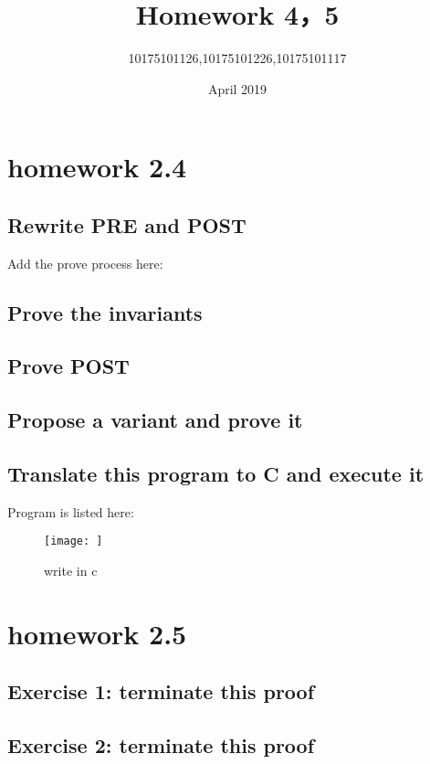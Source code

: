 \documentclass[11pt,a4paper,fleqn]{article}
\title{Homework 4，5}
\author{10175101126,10175101226,10175101117}
\date{April 2019}
\begin{document}
\maketitle

\section{ homework 2.4 }
\subsection{Rewrite PRE and POST }
\noindent
Add the prove process here: \\



\subsection{Prove the invariants}
\noindent


\subsection{ Prove POST}
\noindent




\subsection{Propose a variant and prove it}
\noindent


\subsection{Translate this program to C and execute it}
\noindent
Program is listed here:\\
\begin{figure}[h!]
\centering
\texttt{[image: ]}
\caption{ write in c}
\label{fig}
\end{figure}


\section{homework 2.5}

\subsection{Exercise 1: terminate this proof}
\noindent


\subsection{Exercise 2: terminate this proof}
\noindent
\end{document}
